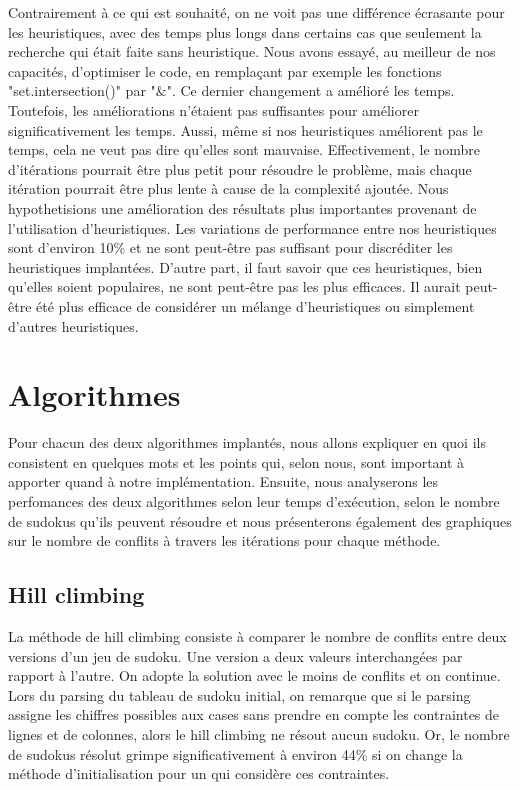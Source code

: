 \documentclass[8pt]{article}
\begin{document}
Contrairement à ce qui est souhaité, on ne voit pas une différence
écrasante pour les heuristiques, avec des temps plus longs dans
certains cas que seulement la recherche qui était faite sans heuristique.
Nous avons essayé, au meilleur de nos capacités, d'optimiser le
code, en remplaçant par exemple les fonctions "set.intersection()" par
"$\&$". Ce dernier changement a amélioré les temps. Toutefois, les améliorations
n'étaient pas suffisantes pour
améliorer significativement les temps. Aussi,
même si nos heuristiques améliorent pas le temps, cela ne veut pas
dire qu'elles sont mauvaise. Effectivement, le nombre d'itérations pourrait
être plus petit pour résoudre le problème, mais chaque itération pourrait être
plus lente à cause de la complexité ajoutée. Nous hypothetisions une amélioration
des résultats plus importantes provenant de l'utilisation d'heuristiques. Les
variations de performance entre nos heuristiques sont d'environ 10\% et ne sont
peut-être pas suffisant pour discréditer les heuristiques implantées. D'autre
part, il faut savoir que ces heuristiques, bien
qu'elles soient populaires, ne sont peut-être pas les plus efficaces. Il aurait
peut-être été plus efficace de considérer un mélange d'heuristiques
ou simplement d'autres heuristiques.

\section{Algorithmes}
Pour chacun des deux algorithmes implantés, nous allons expliquer en quoi ils
consistent en quelques mots et les points qui, selon nous, sont important à
apporter quand à notre implémentation.
Ensuite, nous analyserons les perfomances des deux algorithmes selon
leur temps d'exécution, selon le nombre de sudokus qu'ils peuvent
résoudre et nous présenterons également des graphiques sur le
nombre de conflits à travers les itérations pour chaque méthode.

\subsection{Hill climbing}
La méthode de hill climbing consiste à comparer le nombre de conflits entre
deux versions d'un jeu de sudoku. Une version a deux valeurs interchangées par
rapport à l'autre. On adopte la solution avec le moins de conflits et on continue.
Lors du parsing du tableau de sudoku initial, on
remarque que si le parsing assigne les chiffres possibles aux cases sans prendre
en compte les contraintes de lignes et de colonnes, alors le hill climbing ne
résout aucun sudoku. Or, le nombre de sudokus résolut grimpe significativement
à environ 44\% si on change la méthode d'initialisation pour un qui considère
ces contraintes.
\end{document}
